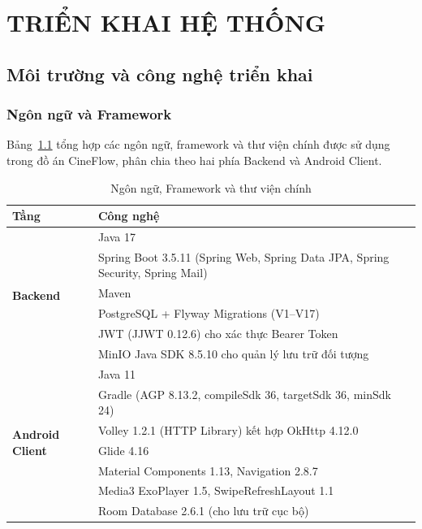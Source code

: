 \chapter{TRIỂN KHAI HỆ THỐNG}
\label{chap:trien_khai}

\section{Môi trường và công nghệ triển khai}
\label{sec:moi_truong_cong_nghe}

\subsection{Ngôn ngữ và Framework}
\label{subsec:ngon_ngu_framework}

Bảng~\ref{tab:lang_framework} tổng hợp các ngôn ngữ, framework và thư viện chính được sử dụng trong đồ án CineFlow, phân chia theo hai phía Backend và Android Client.

\begin{table}[H]
\centering
\caption{Ngôn ngữ, Framework và thư viện chính}
\label{tab:lang_framework}
\renewcommand{\arraystretch}{1.3}
\begin{tabularx}{\textwidth}{|l|X|}
\hline
\textbf{Tầng} & \textbf{Công nghệ} \\
\hline
\multirow{6}{*}{\textbf{Backend}} & Java 17 \\
 & Spring Boot 3.5.11 (Spring Web, Spring Data JPA, Spring Security, Spring Mail) \\
 & Maven \\
 & PostgreSQL + Flyway Migrations (V1--V17) \\
 & JWT (JJWT 0.12.6) cho xác thực Bearer Token \\
 & MinIO Java SDK 8.5.10 cho quản lý lưu trữ đối tượng \\
\hline
\multirow{7}{*}{\textbf{Android Client}} & Java 11 \\
 & Gradle (AGP 8.13.2, compileSdk 36, targetSdk 36, minSdk 24) \\
 & Volley 1.2.1 (HTTP Library) kết hợp OkHttp 4.12.0 \\
 & Glide 4.16 \\
 & Material Components 1.13, Navigation 2.8.7 \\
 & Media3 ExoPlayer 1.5, SwipeRefreshLayout 1.1 \\
 & Room Database 2.6.1 (cho lưu trữ cục bộ) \\
\hline
\end{tabularx}
\end{table}

